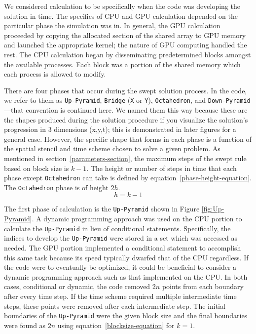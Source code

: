 \documentclass[review]{elsarticle}
\def\Up{\texttt{Up-Pyramid}}
\def\Down{\texttt{Down-Pyramid}}
\def\Oct{\texttt{Octahedron}}
\begin{document}
 \par
 We considered calculation to be specifically when the code was developing the solution in time. The specifics of CPU and GPU calculation depended on the particular phase the simulation was in. In general, the GPU calculation proceeded by copying the allocated section of the shared array to GPU memory and launched the appropriate kernel; the nature of GPU computing handled the rest. The CPU calculation began by disseminating predetermined blocks amongst the available processes. Each block was a portion of the shared memory which each process is allowed to modify.
 
\par
There are four phases that occur during the swept solution process. In the code, we refer to them as \Up{}, \texttt{Bridge} (\texttt{X} or \texttt{Y}), \Oct{}, and \Down{}---that convention is continued here. We named them this way because these are the shapes produced during the solution procedure if you visualize the solution's progression in 3 dimensions (x,y,t); this is demonstrated in later figures for a general case. However, the specific shape that forms in each phase is a function of the spatial stencil and time scheme chosen to solve a given problem. As mentioned in section~\ref{parameters-section}, the maximum steps of the swept rule based on block size is $k-1$. The height or number of steps in time that each phase except \Oct{} can take is defined by equation~\ref{phase-height-equation}. The \Oct{} phase is of height $2h$.
\begin{equation}
    \label{phase-height-equation}
    h=k-1
\end{equation}
 
\par
The first phase of calculation is the \Up{} shown in Figure \ref{fig:Up-Pyramid}. A dynamic programming approach was used on the CPU portion to calculate the \Up{} in lieu of conditional statements. Specifically, the indices to develop the \Up{} were stored in a set which was accessed as needed. The GPU portion implemented a conditional statement to accomplish this same task because its speed typically dwarfed that of the CPU regardless. If the code were to eventually be optimized, it could be beneficial to consider a dynamic programming approach such as that implemented on the CPU. In both cases, conditional or dynamic, the code removed $2n$ points from each boundary after every time step. If the time scheme required multiple intermediate time steps, these points were removed after each intermediate step. The initial boundaries of the \Up{} were the given block size and the final boundaries were found as $2n$ using equation~\ref{blocksize-equation} for $k=1$.
\end{document}
